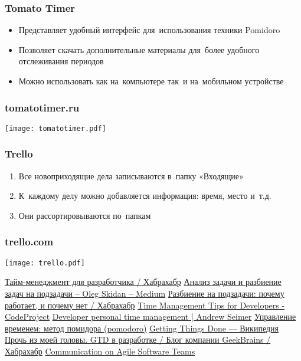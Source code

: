 \documentclass{../industrial-development}
\begin{document}
\begin{frame} \frametitle{Tomato Timer}
  \begin{itemize}
  \item Представляет удобный интерфейс для~использования техники Pomidoro
  \item Позволяет скачать дополнительные материалы для~более удобного отслеживания периодов
  \item Можно использовать как на~компьютере так~и на~мобильном устройстве
  \end{itemize}
\end{frame}

\begin{frame} \frametitle{tomatotimer.ru}
\centerline{\texttt{[image: tomatotimer.pdf]}}
\end{frame}

\begin{frame} \frametitle{Trello}
  \begin{enumerate}
  \item Все новоприходящие дела записываются в~папку «Входящие»
  \item К~каждому делу можно добавляется информация: время, место и~т.д.
  \item Они рассортировываются по~папкам
  \end{enumerate}
\end{frame}

\begin{frame} \frametitle{trello.com}
\centerline{\texttt{[image: trello.pdf]}}
\end{frame}

\begin{thebibliography}{99}
 \href{https://habrahabr.ru/post/259293/}{Тайм-менеджмент для разработчика / Хабрахабр}
 \href{https://medium.com/@skidanolegs/анализ-задачи-и-разбиение-задач-на-подзадачи-21b7865f387f}{Анализ задачи и разбиение задач на подзадачи – Oleg Skidan – Medium}
 \href{https://habrahabr.ru/post/111873/}{Разбиение на подзадачи: почему работает, и почему нет / Хабрахабр}
 \href{https://www.codeproject.com/Articles/11502/Time-Management-Tips-for-Developers}{Time Management Tips for Developers - CodeProject}
 \href{https://lostechies.com/andrewsiemer/2016/01/04/developer-personal-time-management/]}{Developer personal time management | Andrew Seimer}
 \href{https://happydiva.ru/time-management/273-upravlenie-vremenem-metod-pomidora-pomodoro}{Управление временем: метод помидора (pomodoro)}
 \href{https://ru.wikipedia.org/wiki/Getting_Things_Done}{Getting Things Done — Википедия}
 \href{https://habrahabr.ru/company/geekbrains/blog/270865/}{Прочь из моей головы. GTD в разработке / Блог компании GeekBrains / Хабрахабр}
 \href{http://agilemodeling.com/essays/communication.htm}{Communication on Agile Software Teams}
\end{thebibliography}
\end{document}
